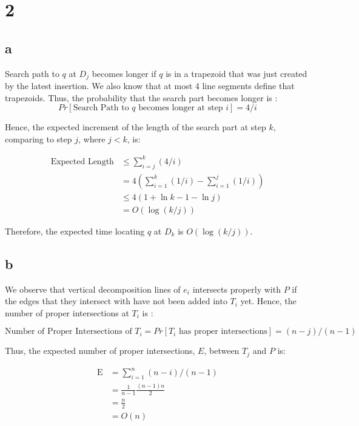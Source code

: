 
\section*{2}
\subsection*{a}
Search path to $q$ at $D_j$ becomes longer if $q$ is in a trapezoid that was just
created by the latest insertion. We also know that at most 4 line segments define
that trapezoids. Thus, the probability that the search part becomes longer is :
$$
Pr[\text{Search Path to $q$ becomes longer at step $i$}] = 4/i
$$

Hence, the expected increment of the length of the search part at step $k$, comparing to step $j$,
where $j<k$, is:

\begin{align*}
    \text{Expected Length} &\leq \sum_{i=j}^{k}( 4/i ) \\
    &= 4( \sum_{i=1}^{k}( 1/i ) -  \sum_{i=1}^{j}( 1/i ) ) \\
    &\leq 4( 1 + \ln k - 1 - \ln j ) \\
    &= O(\log(k/j))
\end{align*}

Therefore, the expected time locating $q$ at $D_k$ is $O(\log(k/j))$.

\subsection*{b}
We observe that vertical decomposition lines of $e_i$ intersects properly with $P$ if 
the edges that they intersect with have not been added into $T_i$ yet. Hence,
the number of proper intersections at $T_i$ is :

$$
\text{Number of Proper Intersections of $T_i$} = Pr[\text{$T_i$ has proper intersections}] = (n-j)/(n-1)
$$

Thus, the expected number of proper intersections, $E$, between $T_j$ and $P$ is:

\begin{align*}
    \text{E} &= \sum_{i=1}^{n}(n-i)/(n-1) \\
    &= \frac{1}{n-1}\frac{(n-1)n}{2} \\
    &= \frac{n}{2} \\
    &= O(n)
\end{align*}
